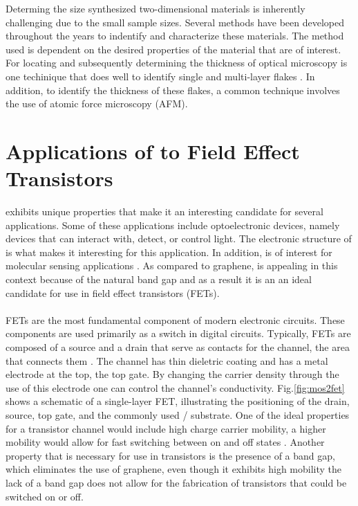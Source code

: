 \documentclass[%
 reprint,
 amsmath,amssymb,
 aps,
pra,
floatfix,
]{revtex4-1}
\begin{document}
Determing the size synthesized two-dimensional materials is inherently challenging due to the small sample sizes. Several methods have been developed throughout the years to indentify and characterize these materials. The method used is dependent on the desired properties of the material that are of interest. For locating and subsequently determining the thickness of  optical microscopy is one techinique that does well to identify single and multi-layer flakes \cite{acsnanoReview2013}. In addition, to identify the thickness of these flakes, a common technique involves the use of atomic force microscopy (AFM).

\section{\label{sec:mos2_applications} Applications of  to Field Effect Transistors}
 exhibits unique properties that make it an interesting candidate for several applications. Some of these applications include optoelectronic devices, namely devices that can interact with, detect, or control light. The electronic structure of  is what makes it interesting for this application. In addition,  is of interest for molecular sensing applications \cite{Wang2012a}. As compared to graphene,  is appealing in this context because of the natural band gap and as a result it is an an ideal candidate for use in field effect transistors (FETs). \\ \\
FETs are the most fundamental component of modern electronic circuits. These components are used primarily as a switch in digital circuits.  Typically, FETs are composed of a source and a drain that serve as contacts for the channel, the area that connects them \cite{Millman1991}. The channel has thin dieletric coating and has a metal electrode at the top, the top gate. By changing the carrier density through the use of this electrode one can control the channel's conductivity. Fig.\ref{fig:mos2fet} shows a schematic of a single-layer  FET, illustrating the positioning of the drain, source, top gate, and the commonly used / substrate. One of the ideal properties for a transistor channel would include high charge carrier mobility, a higher mobility would allow for fast switching between on and off states \cite{Lembke2015}. Another property that is necessary for use in transistors is the presence of a band gap, which eliminates the use of graphene, even though it exhibits high mobility the lack of a band gap does not allow for the fabrication of transistors that could be switched on or off. \\ \\
\end{document}
